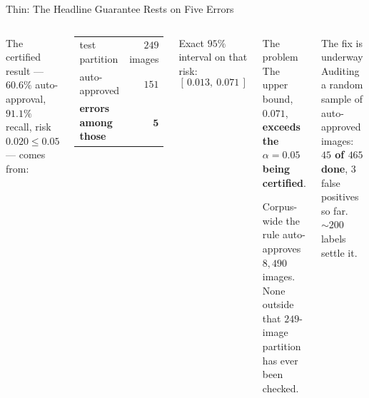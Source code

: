 \documentclass[aspectratio=169,11pt]{beamer}
\begin{document}
\begin{frame}{Thin: The Headline Guarantee Rests on Five Errors}
\begin{columns}[T]
\small
The certified result --- $60.6\%$ auto-approval, $91.1\%$ recall, risk $0.020 \le 0.05$ --- comes from:
\vspace{2mm}
\begin{center}
\begin{tabular}{@{}l r@{}}
test partition & $249$ images \\
auto-approved & $151$ \\
\textbf{errors among those} & $\mathbf{5}$ \\
\end{tabular}
\end{center}
\vspace{2mm}
Exact $95\%$ interval on that risk:
\[
[\,0.013,\ \mathbf{0.071}\,]
\]

\begin{alertblock}{\small The problem}
\footnotesize The upper bound, $0.071$, \textbf{exceeds the $\alpha = 0.05$ being certified}.
\vspace{1mm}

Corpus-wide the rule auto-approves $8{,}490$ images. None outside that $249$-image partition has ever been checked.
\end{alertblock}
\vspace{1mm}
\begin{exampleblock}{\small The fix is underway}
\footnotesize Auditing a random sample of auto-approved images: \textbf{$45$ of $465$ done}, $3$ false positives so far. $\sim200$ labels settle it.
\end{exampleblock}
\end{columns}
\end{frame}
\end{document}

